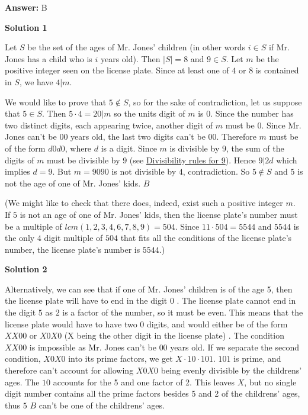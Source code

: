 \begin{enumerate}
 \textbf{Answer: }B



\textbf{Solution 1}

Let $S$ be the set of the ages of Mr. Jones' children (in other words $i \in S$ if Mr. Jones has a child who is $i$ years old). Then $|S| = 8$ and $9 \in S$. Let $m$ be the positive integer seen on the license plate. Since at least one of $4$ or $8$ is contained in $S$, we have $4 | m$.

 We would like to prove that $5 \not\in S$, so for the sake of contradiction, let us suppose that $5 \in S$. Then $5\cdot 4 = 20 | m$ so the units digit of $m$ is $0$. Since the number has two distinct digits, each appearing twice, another digit of $m$ must be $0$. Since Mr. Jones can't be $00$ years old, the last two digits can't be $00$. Therefore $m$ must be of the form $d0d0$, where $d$ is a digit. Since $m$ is divisible by $9$, the sum of the digits of $m$ must be divisible by $9$ (see \href{https://artofproblemsolving.com/wiki/index.php?title=Divisibility\_rules/Rule\_for\_3\_and\_9\_proof}{ Divisibility rules for 9}). Hence $9 | 2d$ which implies $d = 9$. But $m = 9090$ is not divisible by $4$, contradiction. So $5 \not\in S$ and $5$ is not the age of one of Mr. Jones' kids. $\boxed{ B }$

 (We might like to check that there does, indeed, exist such a positive integer $m$. If $5$ is not an age of one of Mr. Jones' kids, then the license plate's number must be a multiple of $lcm(1,2,3,4,6,7,8,9) = 504$. Since $11\cdot504 = 5544$ and $5544$ is the only $4$ digit multiple of $504$ that fits all the conditions of the license plate's number, the license plate's number is $5544$.)

 



\textbf{Solution 2}

Alternatively, we can see that if one of Mr. Jones' children is of the age 5, then the license plate will have to end in the digit $0$ . The license plate cannot end in the digit $5$ as $2$ is a factor of the number, so it must be even. This means that the license plate would have to have two $0$ digits, and would either be of the form $XX00$ or $X0X0$ (X being the other digit in the license plate) . The condition $XX00$ is impossible as Mr. Jones can't be $00$ years old. If we separate the second condition, $X0X0$ into its prime factors, we get $X\cdot 10\cdot 101$. $101$ is prime, and therefore can't account for allowing $X0X0$ being evenly divisible by the childrens' ages.  The $10$ accounts for the 5 and one factor of 2. This leaves $X$, but no single digit number contains all the prime factors besides 5 and 2 of the childrens' ages, thus $5$ $\boxed{ B }$ can't be one of the childrens' ages.


\end{enumerate}

